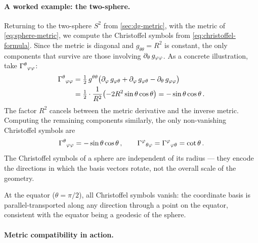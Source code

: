 \paragraph{A worked example: the two-sphere.}

Returning to the two-sphere $S^2$ from \cref{sec:dg-metric}, with
the metric of \cref{eq:sphere-metric}, we compute the Christoffel symbols
from \cref{eq:christoffel-formula}.  Since the
metric is diagonal and $g_{\theta\theta} = R^2$ is constant, the only
components that survive are those involving $\partial_{\theta}\, g_{\varphi\varphi}$.
As a concrete illustration, take $\Gamma^{\theta}{}_{\varphi \varphi}$:
%
\begin{align}
  \Gamma^{\theta}{}_{\varphi \varphi}
    &= \tfrac{1}{2}\, g^{\theta\theta}
      \bigl(\partial_{\varphi}\,g_{\varphi\theta}
      + \partial_{\varphi}\,g_{\varphi\theta}
      - \partial_{\theta}\,g_{\varphi\varphi}\bigr)
  \notag \\
    &= \tfrac{1}{2} \cdot \frac{1}{R^2}
      \bigl(-2R^2 \sin\theta\cos\theta\bigr)
    = -\sin\theta\cos\theta \,.
  \label{eq:sphere-christoffel-detail}
\end{align}
%
The factor $R^2$ cancels between the metric derivative and the inverse metric.
Computing the remaining components similarly, the only non-vanishing Christoffel
symbols are
%
\begin{equation}
  \Gamma^{\theta}{}_{\varphi \varphi} = -\sin\theta\cos\theta \,,\qquad
  \Gamma^{\varphi}{}_{\theta \varphi}
    = \Gamma^{\varphi}{}_{\varphi \theta} = \cot\theta \,.
  \label{eq:sphere-christoffel}
\end{equation}
%
The Christoffel symbols of a sphere are independent of its radius --- they
encode the directions in which the basis vectors rotate, not the overall scale
of the geometry.

At the equator ($\theta = \pi/2$), all Christoffel symbols vanish: the
coordinate basis is parallel-transported along any direction through a point on
the equator, consistent with the equator being a geodesic of the sphere.

\paragraph{Metric compatibility in action.}

